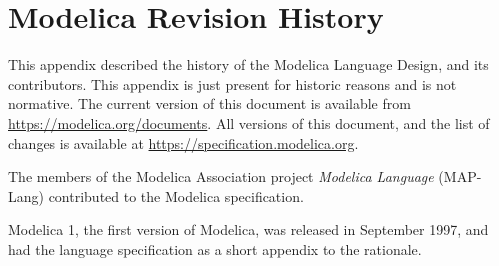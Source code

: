 \chapter{Modelica Revision History}\label{modelica-revision-history}

This appendix described the history of the Modelica Language Design, and its contributors.
This appendix is just present for historic reasons and is not normative.
The current version of this document is available from \url{https://modelica.org/documents}.
All versions of this document, and the list of changes is available at \url{https://specification.modelica.org}.

The members of the Modelica Association project \emph{Modelica Language} (MAP-Lang) contributed to the Modelica specification.

Modelica 1, the first version of Modelica, was released in September 1997, and had the language specification as a short appendix to the rationale.
